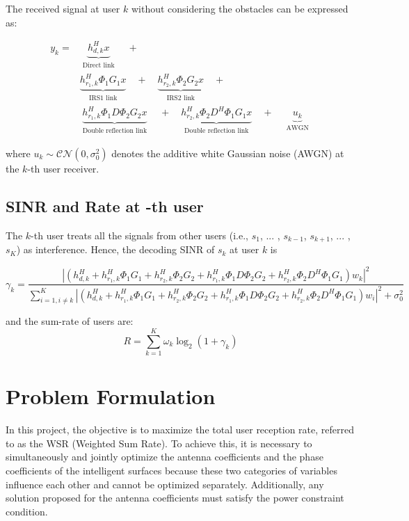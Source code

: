 \documentclass{article}
\begin{document}
The received signal at user $k$ without considering the obstacles can be expressed as:

\begin{align*}
	y_k = &\underbrace{h_{d,k}^H x}_
	{\substack{\text{Direct link}}}
	\quad + \quad \\
	&\underbrace{h_{r_1,k}^H \Phi_1 G_1 x}_
	{\substack{\text{IRS1 link}}}
	\quad + \quad
	\underbrace{h_{r_2,k}^H \Phi_2 G_2 x}_
	{\substack{\text{IRS2 link}}}
	\quad + \quad \\ 
	&\underbrace{h_{r_1,k}^H \Phi_1 D \Phi_2 G_2 x}_
	{\substack{\text{Double reflection link}}}
	\quad + \quad
	\underbrace{h_{r_2,k}^H \Phi_2 D^H \Phi_1 G_1 x}_
	{\substack{\text{Double reflection link}}} \quad + \quad
	\underbrace{u_k}_
	{\substack{\text{AWGN}}}
\end{align*}

where $u_k \sim \mathcal{CN}(0, \sigma_0^2)$ denotes the additive white Gaussian noise (AWGN) at the $k$-th user receiver.

\subsection{SINR and Rate at -th user}
The $k$-th user treats all the signals from other users (i.e.,
$s_1$, ... , $s_{k-1}$, $s_{k+1}$, ... , $s_K$) as interference. Hence, the decoding SINR of $s_k$ at user $k$ is

\[
\gamma_k = \frac{{\left|\left(h_{d,k}^H + h_{r_1,k}^H \Phi_1 G_1 + h_{r_2,k}^H \Phi_2 G_2 + h_{r_1,k}^H \Phi_1 D \Phi_2 G_2 + h_{r_2,k}^H \Phi_2 D^H \Phi_1 G_1 \right)w_k\right|^2}}{{\sum_{i=1,i\neq k}^{K} \left|\left(h_{d,k}^H + h_{r_1,k}^H \Phi_1 G_1 + h_{r_2,k}^H \Phi_2 G_2 + h_{r_1,k}^H \Phi_1 D \Phi_2 G_2 + h_{r_2,k}^H \Phi_2 D^H \Phi_1 G_1 \right)w_i\right|^2 + \sigma^2_0}}
\]

and the sum-rate of users are:
\[R = \sum_{k=1}^{K} \omega_k \log_2(1 + \gamma_k)\]

\section{Problem Formulation}
In this project, the objective is to maximize the total user reception rate, referred to as the WSR (Weighted Sum Rate). To achieve this, it is necessary to simultaneously and jointly optimize the antenna coefficients and the phase coefficients of the intelligent surfaces because these two categories of variables influence each other and cannot be optimized separately. Additionally, any solution proposed for the antenna coefficients must satisfy the power constraint condition.
\end{document}
